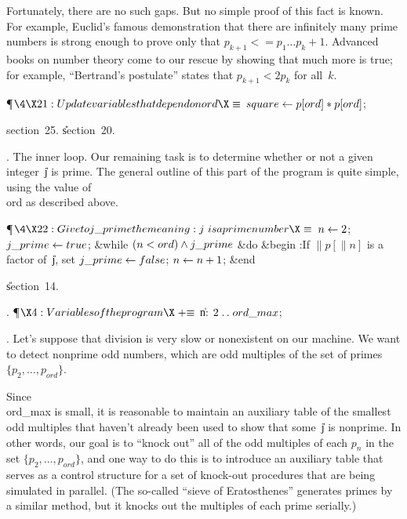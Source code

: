 Fortunately, there are no such gaps. But no simple proof of this fact is
known. For example, Euclid's famous demonstration that there are
infinitely many prime numbers is strong enough to prove only that
$p_{k+1}<=p_1\ldots p_k+1$. Advanced books on number theory come to our
rescue by showing that much more is true; for example, ``Bertrand's
postulate''  states that $p_{k+1}<2p_k$
for all~$k$.

\Y\P$\4\X21:Update variables that depend on~\\{ord}\X\S$\6
$\\{square}\K\|p[\\{ord}]\ast\|p[\\{ord}]$;\par
\A section~25.
\U section~20.\fi


.  The inner loop.
Our remaining task is to determine whether or not a given integer~\|j is prime.
The general outline of this part of the program is quite simple,
using the value of \\{ord} as described above.

\Y\P$\4\X22:Give to \\{j\_prime} the meaning: \|j~is a prime number\X\S$\6
$\|n\K2$;\5
$\\{j\_prime}\K\\{true}$;\6
\&{while} $(\|n<\\{ord})\W\\{j\_prime}$ \1\&{do}\6
\&{begin} :If $\|p[\|n]$ is a factor of~\|j, set $\\{j\_prime}\K%
\\{false}$\X;\6
$\|n\K\|n+1$;\6
\&{end}\2\par
\U section~14.\fi

. \P$\X4:Variables of the program\X\mathrel{+}\S$\6
\4\|n: $2\to\\{ord\_max}$;\par
\fi

. Let's suppose that division is very slow or nonexistent on our
machine. We want to detect nonprime odd numbers, which are odd multiples
of the set of primes $\{p_2,\ldots,p_{ord}\}$.

Since \\{ord\_max} is small, it is reasonable to maintain an auxiliary table of
the smallest odd multiples that haven't already been used to show that
some~\|j is nonprime. In other words, our goal is to ``knock out'' all
of the odd multiples of each $p_n$ in the set $\{p_2,\ldots,p_{ord}\}$,
and one way to do this is to introduce an auxiliary table that serves as
a control structure for a set of knock-out procedures that are being
simulated in parallel. (The so-called ``sieve of Eratosthenes''
generates primes by a similar method, but
it knocks out the multiples of each prime serially.)

